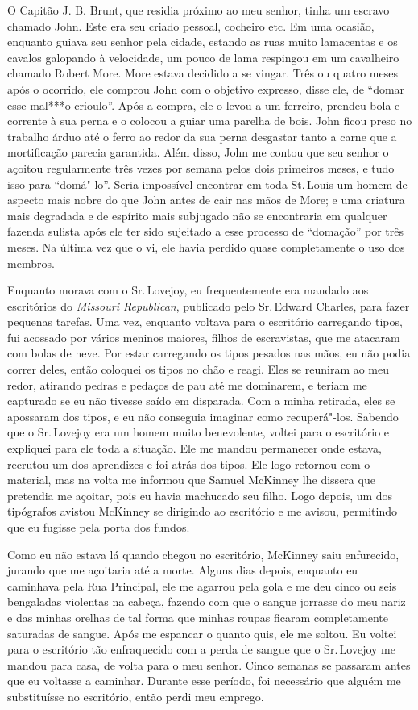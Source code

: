 O Capitão J. B. Brunt, que residia próximo ao meu senhor, tinha um
escravo chamado John. Este era seu criado pessoal, cocheiro etc. Em uma
ocasião, enquanto guiava seu senhor pela cidade, estando as ruas muito
lamacentas e os cavalos galopando à velocidade, um pouco de lama
respingou em um cavalheiro chamado Robert More. More estava decidido a
se vingar. Três ou quatro meses após o ocorrido, ele comprou John com o
objetivo expresso, disse ele, de ``domar esse mal***o crioulo''. Após a
compra, ele o levou a um ferreiro, prendeu bola e corrente à sua perna e
o colocou a guiar uma parelha de bois. John ficou preso no trabalho
árduo até o ferro ao redor da sua perna desgastar tanto a carne que a
mortificação parecia garantida. Além disso, John me contou que seu
senhor o açoitou regularmente três vezes por semana pelos dois primeiros
meses, e tudo isso para ``domá"-lo''. Seria impossível encontrar em toda
St.\,Louis um homem de aspecto mais nobre do que John antes de cair nas
mãos de More; e uma criatura mais degradada e de espírito mais subjugado
não se encontraria em qualquer fazenda sulista após ele ter sido
sujeitado a esse processo de ``domação'' por três meses. Na última vez
que o vi, ele havia perdido quase completamente o uso dos membros.

Enquanto morava com o Sr.\,Lovejoy, eu frequentemente era mandado aos
escritórios do \emph{Missouri Republican}, publicado pelo Sr.\,Edward
Charles, para fazer pequenas tarefas. Uma vez, enquanto voltava para o
escritório carregando tipos, fui acossado por vários meninos maiores,
filhos de escravistas, que me atacaram com bolas de neve. Por estar
carregando os tipos pesados nas mãos, eu não podia correr deles, então
coloquei os tipos no chão e reagi. Eles se reuniram ao meu redor,
atirando pedras e pedaços de pau até me dominarem, e teriam me capturado
se eu não tivesse saído em disparada. Com a minha retirada, eles se
apossaram dos tipos, e eu não conseguia imaginar como recuperá"-los.
Sabendo que o Sr.\,Lovejoy era um homem muito benevolente, voltei para o
escritório e expliquei para ele toda a situação. Ele me mandou
permanecer onde estava, recrutou um dos aprendizes e foi atrás dos
tipos. Ele logo retornou com o material, mas na volta me informou que
Samuel McKinney lhe dissera que pretendia me açoitar, pois eu havia
machucado seu filho. Logo depois, um dos tipógrafos avistou McKinney se
dirigindo ao escritório e me avisou, permitindo que eu fugisse pela
porta dos fundos.

Como eu não estava lá quando chegou no escritório, McKinney saiu
enfurecido, jurando que me açoitaria até a morte. Alguns dias depois,
enquanto eu caminhava pela Rua Principal, ele me agarrou pela gola e me
deu cinco ou seis bengaladas violentas na cabeça, fazendo com que o
sangue jorrasse do meu nariz e das minhas orelhas de tal forma que
minhas roupas ficaram completamente saturadas de sangue. Após me
espancar o quanto quis, ele me soltou. Eu voltei para o escritório tão
enfraquecido com a perda de sangue que o Sr.\,Lovejoy me mandou para
casa, de volta para o meu senhor. Cinco semanas se passaram antes que eu
voltasse a caminhar. Durante esse período, foi necessário que alguém me
substituísse no escritório, então perdi meu emprego.


